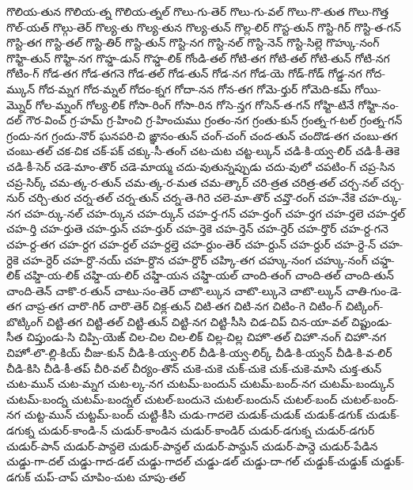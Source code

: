 {గొలియ-తున
గొలియ-త్న
గొలియ-త్నల్
గొలు-గు-తెర్
గొలు-గు-వల్
గొలు-గొ-తుత
గొలు-గొత్త
గొల్-యత్
గొల్గు-తెర్
గొల్య-తు
గొల్య-తున
గొల్య-తున్
గొల్ల-లిర్
గొస్ట-తున్
గొస్టి-గిర్
గొస్టి-త-గన్
గొస్టి-తగ
గొస్టి-తల్
గొస్టి-తిర్
గొస్టి-తున్
గొస్టి-నగ
గొస్టి-నల్
గొస్టి-నెన్
గొస్టి-సిల్లె
గొహ్కు-నంగ్
గొహ్టి-తున్
గొహ్టి-నగ
గొహ్డ-డున్
గొహ్డ-లిక్
గోండి-తల్
గోటి-తగ
గోటి-తల్
గోటి-తున్
గోటి-నగ
గోటిం-గ్
గోడ-తగ
గోడ-తగనె
గోడ-తల్
గోడ-తున్
గోడ-నగ
గోడ-యె
గోడ్-గోడ్
గోడ్డ-నగ
గోద-మ్కున్
గోద-మ్నగ
గోద-మ్నల్
గోదం-క్నగ
గోదా-నన
గోన-తగ
గోమె-ర్తుర్
గోమెది-కమ్
గోయి-మ్నొర్
గోల-మ్నంగ్
గోల్య-లిక్
గోసా-రింగ్
గోసా-రిన
గోసె-న్తగ
గోసెన్-త-గన్
గోహ్టి-టినే
గోహ్టి-నం-దల్
గౌర-వించ్
గ్ర-హమ్
గ్ర-హించి
గ్ర-హించుము
గ్రంతం-నగ
గ్రంతు-కున్
గ్రంత్న-గ-టల్
గ్రంత్న-గన్
గ్రందు-నగ
గ్రందు-నొర్
ఘనపరి-చి
ఙ్ఞానం-తున్
చంగ్-చంగ్
చంద-తున్
చందొడ-తగ
చంబు-తగ
చంబు-తల్
చక-చిక
చక్-పక్
చక్కు-సీ-తంగ్
చట-చుట
చట్ట-ల్కున్
చడి-కి-య్వ-లిర్
చడి-కీ-తెకె
చడి-కీ-సెర్
చడె-మాం-తొర్
చడె-మాయ్మ
చదు-వుతున్నప్పుడు
చదు-వులో
చపటిం-గ్
చప్ర-సిన
చప్ర-సిర్క్
చమ-త్క-ర-తున్
చమ-త్క-ర-మత
చమ-త్కార్
చరి-త్రత
చరిత్ర-తల్
చర్చ-నల్
చర్చ-నుర్
చర్చి-తుర
చర్న-తల్
చర్న-తున్
చర్న-తె-గిరె
చలె-మా-తొర్
చవ్తొ-రంగ్
చహ-నేకె
చహ-ర్కు-నగ
చహ-ర్కు-నల్
చహ-ర్కున
చహ-ర్కున్
చహ-ర్త-గన్
చహ-ర్తంగ్
చహ-ర్తగ
చహ-ర్తలె
చహ-ర్తల్
చహ-ర్తి
చహ-ర్తుతె
చహ-ర్తున్
చహ-ర్తుర్
చహ-ర్తెకె
చహ-ర్తెన్
చహ-ర్తెర్
చహ-ర్తొర్
చహ-ర్ద-గనె
చహ-ర్ద-తగ
చహ-ర్దగ
చహ-ర్దల్
చహ-ర్దల్తె
చహ-ర్దుం-తెర్
చహ-ర్దున్
చహ-ర్దుర్
చహ-ర్దె-న్
చహ-ర్దెకె
చహ-ర్దెర్
చహ-ర్దొ-నయ్
చహ-ర్దొన
చహ-ర్దొర్
చహ్కి-తగ
చహ్కు-నంగ
చహ్కు-నంగ్
చహ్డ-లిక్
చహ్డి-య-లిక్
చహ్డి-య-లిర్
చహ్డి-యన
చహ్డి-యల్
చాంది-తంగ్
చాంది-తల్
చాంది-తున్
చాంది-తెన్
చాకొ-ర-తున్
చాటు-సం-తెర్
చాటొ-ల్కున
చాటొ-ల్కునె
చాటొ-ల్కున్
చాతి-గుం-డె-తగ
చాప్ర-తగ
చారొ-గిర్
చారొ-తెర్
చిక్ల-తున్
చిటి-తగ
చిటి-నగ
చిటిం-గె
చిటిం-గ్
చిట్కింగ్-బొట్కింగ్
చిట్టి-తగ
చిట్టి-తల్
చిట్టి-తున్
చిట్టి-నగ
చిట్టి-సీసి
చిడ-చిప్
చిన-యా-వల్
చిప్టుండు-సీత
చిప్తుండు-సి
చిప్పి-యెఙ్
చిల-చిల
చిల-లిక్
చిల్ల-చిల్ల
చిహొ-తల్
చిహొ-నంగ్
చిహొ-నగ
చిహో-లొ-ల్లి-కియ్
చీజు-కున్
చీడి-కి-య్వ-లిర్
చీడి-కి-య్వ-లిర్క్
చీడి-కి-య్వన్
చీడి-కి-వ-లిర్
చీడి-కిసి
చీడి-కీ-తప్
చీరి-వల్
చీర్యం-తొన్
చుకె-చుకె
చుక్-చుకె
చుక్-చుకె-మాసి
చుక్త-తున్
చుట-మున్
చుట-మ్నగ
చుట-ల్క-నగ
చుటమ్-బందున్
చుటమ్-బంద్-నగ
చుటమ్-బంద్కున్
చుటమ్-బంద్న
చుటమ్-బంద్నల్
చుటల్-బందునె
చుటల్-బందున్
చుటల్-బంద్
చుటల్-బంద్-నగ
చుట్ట-మున్
చుట్టమ్-బంద్
చుట్టి-కీసి
చుడు-గాదలె
చుడుక్-చుడుక్
చుడుక్-డగుక్
చుడుక్-డగుక్న
చుడుర్-కాండి-న్
చుడుర్-కాండిన
చుడుర్-కాండిర్
చుడుర్-డగుక్న
చుడుర్-డగుర్
చుడుర్-పాన్
చుడుర్-పాన్దలె
చుడుర్-పాన్దల్
చుడుర్-పాన్దున్
చుడుర్-పాన్దె
చుడుర్-పేడిన
చుడ్డు-గా-దల్
చుడ్డు-గాద-డల్
చుడ్డు-గాదల్
చుడ్డు-డల్
చుడ్డు-దా-గల్
చుడ్డుక్-చుడ్డుక్
చుడ్డుక్-డగుక్
చుప్-చాప్
చూపిం-చుట
చూపు-తల్
}
